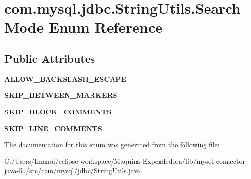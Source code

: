 \hypertarget{enumcom_1_1mysql_1_1jdbc_1_1_string_utils_1_1_search_mode}{}\section{com.\+mysql.\+jdbc.\+String\+Utils.\+Search\+Mode Enum Reference}
\label{enumcom_1_1mysql_1_1jdbc_1_1_string_utils_1_1_search_mode}
\subsection*{Public Attributes}
\begin{DoxyCompactItemize}
\item 
\mbox{\label{enumcom_1_1mysql_1_1jdbc_1_1_string_utils_1_1_search_mode_a2030d68987673b4d27903aa0cd6563ab}} 
{\bfseries A\+L\+L\+O\+W\+\_\+\+B\+A\+C\+K\+S\+L\+A\+S\+H\+\_\+\+E\+S\+C\+A\+PE}
\item 
\mbox{\label{enumcom_1_1mysql_1_1jdbc_1_1_string_utils_1_1_search_mode_a39e887b5ee2a7b8baa3fe32e52165e48}} 
{\bfseries S\+K\+I\+P\+\_\+\+B\+E\+T\+W\+E\+E\+N\+\_\+\+M\+A\+R\+K\+E\+RS}
\item 
\mbox{\label{enumcom_1_1mysql_1_1jdbc_1_1_string_utils_1_1_search_mode_a3cde99149ebce5e16f7f3c76c692a658}} 
{\bfseries S\+K\+I\+P\+\_\+\+B\+L\+O\+C\+K\+\_\+\+C\+O\+M\+M\+E\+N\+TS}
\item 
\mbox{\label{enumcom_1_1mysql_1_1jdbc_1_1_string_utils_1_1_search_mode_abbcc79c9f0eaf96e2d2836bbc379a82f}} 
{\bfseries S\+K\+I\+P\+\_\+\+L\+I\+N\+E\+\_\+\+C\+O\+M\+M\+E\+N\+TS}
\end{DoxyCompactItemize}


The documentation for this enum was generated from the following file\+:\begin{DoxyCompactItemize}
\item 
C\+:/\+Users/\+Imanol/eclipse-\/workspace/\+Maquina Expendedora/lib/mysql-\/connector-\/java-\/5../src/com/mysql/jdbc/String\+Utils.\+java\end{DoxyCompactItemize}
